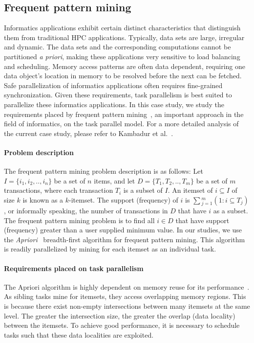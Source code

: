 \documentclass{sig-alternate}
\begin{document}
\subsection{Frequent pattern mining}
\label{sec:fim}
Informatics applications exhibit certain distinct characteristics that
distinguish them from traditional HPC applications.  Typically, data sets are
large, irregular and dynamic. The data sets and the corresponding computations
cannot be partitioned \textit{a priori}, making these applications very
sensitive to load balancing and scheduling.  Memory access patterns are often
data dependent, requiring one data object's location in memory to be resolved
before the next can be fetched.  Safe parallelization of informatics
applications often requires fine-grained synchronization.  Given these
requirements, task parallelism is best suited to parallelize these informatics
applications. In this case study, we study the requirements placed by frequent
pattern mining~\cite{Agrawal:1994}, an important approach in the field of
informatics, on the task parallel model. For a more detailed analysis of the
current case study, please refer to Kambadur
et al.~\cite{kambadur09:frequent_pattern_mining}.

\paragraph{Problem description}
The frequent pattern mining problem description is as follows: Let
$I=\{i_{1},i_{2},..,i_{n}\}$ be a set of $n$ items, and let
$D=\{T_{1},T_{2},..,T_{m}\}$  be a set of $m$ transactions, where each
transaction $T_{i}$ is a subset of $I$. An itemset of $i \subseteq{} I$ of size
$k$ is known as a $k$-itemset. The support (frequency) of $i$ is
$\sum{}_{j=1}^{m} (1:i\subseteq{}T_{j})$, or informally speaking, the number of
transactions in $D$ that have $i$ as a subset. The frequent pattern mining
problem is to find all $i \in{} D$ that have support (frequency) greater than a
user supplied minimum value.
In our studies, we use the \textit{Apriori}~\cite{Agrawal:1994:Apriori}
breadth-first algorithm for frequent pattern mining.  This algorithm is readily
parallelized by mining for each itemset as an individual task.

\paragraph{Requirements placed on task parallelism}
The Apriori algorithm is highly dependent on memory reuse for its
performance~\cite{Ghoting:2007}. As sibling tasks mine for itemsets, they
access overlapping memory regions.  This is because there exist non-empty
intersections between many itemsets at the same level. The greater the
intersection size, the greater the overlap (data locality) between the
itemsets. To achieve good performance, it is necessary to schedule tasks such
that these data localities are exploited.
\end{document}
